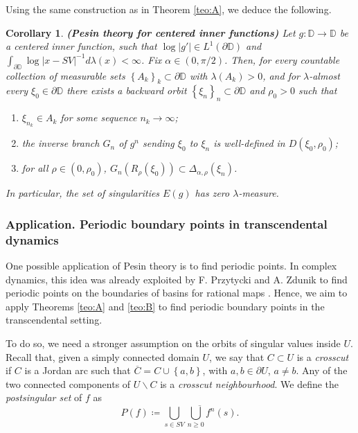 \documentclass[11pt]{article}
\theoremstyle{definition}
\theoremstyle{remark}
\newcounter{main}
\theoremstyle{plain}
\newtheorem{maincor}[main]{Corollary}
\begin{document}
Using the same construction as in Theorem \ref{teo:A}, we deduce the following.

\begin{maincor}\label{corol:D}{\bf (Pesin theory for centered inner functions)}
		Let $ g\colon\mathbb{D}\to\mathbb{D} $ be a centered inner function,  such that $ \log \left| g'\right|\in L^1(\partial\mathbb{D})$ and $ \int_{\partial \mathbb{D}} \log\left| x-SV\right|^{-1} d\lambda(x)<\infty  $. Fix $ \alpha\in (0,\pi/2) $. 
		Then, for  every countable collection of measurable sets $ \left\lbrace A_k\right\rbrace _k\subset\partial \mathbb{D} $ with $ \lambda(A_k)>0 $, and for $ \lambda$-almost every $ \xi_0\in\partial \mathbb{D} $ there exists a backward orbit $ \left\lbrace \xi_n\right\rbrace _n \subset\partial \mathbb{D}$ and $ \rho_0>0 $ such that
		\begin{enumerate}[label={\em (\alph*)}]
			\item  $ \xi_{n_k}\in A_k$ for some sequence $ n_k\to\infty $;

		\item the inverse branch $ G_n $ of $ g^n $ sending $\xi_0 $ to $ \xi_n $ is well-defined in $ D(\xi_0,\rho_0) $;
		\item for all $ \rho\in (0,\rho_0) $, $ G_n(R_{\rho}(\xi_0))\subset \Delta_{  \alpha, \rho}(\xi_n)$.
	\end{enumerate}
	In particular, the set of singularities $ E(g) $ has zero $ \lambda $-measure.
\end{maincor}

\subsubsection*{Application. Periodic boundary points in transcendental dynamics}
One possible application of Pesin theory is to find periodic points. In complex dynamics, this idea was already exploited by F. Przytycki and A. Zdunik to find periodic points on the boundaries of basins for rational maps \cite{Przytycki-Zdunik}. Hence, we aim to apply Theorems \ref{teo:A} and \ref{teo:B} to find periodic boundary points in the transcendental setting. 
 
 To do so, we need a stronger assumption on the orbits of singular values inside $ U $. Recall that, given a simply connected domain $ U $, we say that $ C\subset U $ is a {\em crosscut}  if $ C $ is a Jordan arc such that $ \overline{C}= C\cup \left\lbrace a,b\right\rbrace  $, with $ a,b\in\partial U $, $ a\neq b $. Any of the two connected components of $ U\smallsetminus C $ is a {\em crosscut neighbourhood}.
We define the 
\textit{postsingular set} of $ f $ as \[ P(f)\coloneqq \overline {\bigcup\limits_{s\in SV}\bigcup\limits_{n\geq 0} f^n(s)}.\]
\end{document}
